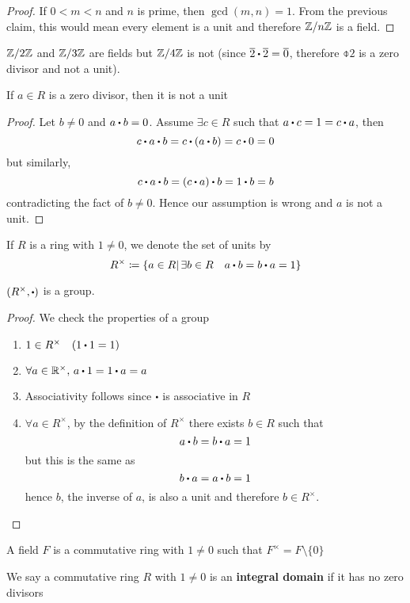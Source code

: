 \documentclass[../Main.tex]{subfiles}
\begin{document}
\begin{proof}
	If $0<m<n$ and $n$ is prime, then $\gcd(m,n)=1$. From the previous claim, this would mean every element is a unit and therefore $\mathbb{Z}/n\mathbb{Z}$ is a field.
\end{proof}
\begin{example}
	$\mathbb{Z}/2\mathbb{Z}$ and $\mathbb{Z}/3\mathbb{Z}$ are fields but $\mathbb{Z}/4\mathbb{Z}$ is not (since $\obar{2}\rdot \obar{2} = \obar{0}$, therefore $\obar{2}$ is a zero divisor and not a unit).
\end{example}
\newpage
\begin{claim}
	If $a\in R$ is a zero divisor, then it is not a unit
\end{claim}
\begin{proof}
	Let $b\ne 0$ and $a\rdot b=0$.\newline
	Assume $\exists c\in R$ such that $a\rdot c=1=c\rdot a$, then
	\[c\rdot a\rdot b=c\rdot (a\rdot b)=c\rdot 0=0\]
	but similarly,
	\[c\rdot a\rdot b=(c\rdot a)\rdot b=1\rdot b=b\]
	contradicting the fact of $b\ne0$. Hence our assumption is wrong and $a$ is not a unit.
\end{proof}
\begin{dfn}[title=Group of Units]
	If $R$ is a ring with $1\ne0$, we denote the set of units by 
	\[R^\times \coloneqq\{a\in R|\, \exists b\in R \quad a\rdot b=b\rdot a=1\}\]
\end{dfn}
\begin{claim}
	$(R^\times,\rdot )$ is a group.
\end{claim}
\begin{proof} We check the properties of a group
	\begin{enumerate}
		\item $1 \in R^\times \quad (1\rdot 1=1)$
		\item $\forall a \in \R^\times,\, a\rdot 1=1\rdot a=a$
		\item Associativity follows since $\rdot$ is associative in $R$
		\item $\forall a \in R^\times$, by the definition of $R^\times$ there exists $b\in R$ such that
		\[a\rdot b=b\rdot a=1\]
		but this is the same as
		\[b\rdot a=a\rdot b=1\]
		hence $b$, the inverse of $a$, is also a unit and therefore $b\in R^\times$.
	\end{enumerate}
\end{proof}
A field $F$ is a commutative ring with $1\ne 0$ such that $F^\times = F \setminus\{0\}$
\begin{dfn}[title= Integral Domain]
	We say a commutative ring $R$ with $1\ne 0$ is an \textbf{integral domain} if it has no zero divisors
\end{dfn}
\end{document}
